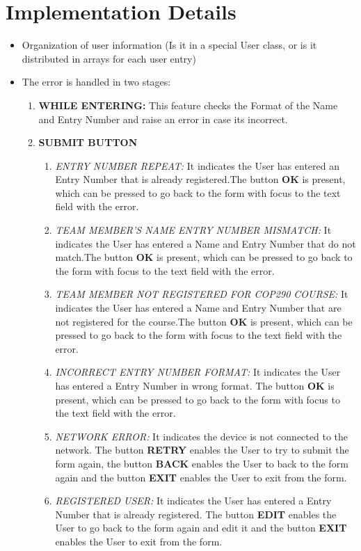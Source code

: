 \documentclass[12pt]{article}
\begin{document}
\section{Implementation Details}

\begin{itemize}
\item Organization of user information (Is it in a special User class, or is it distributed in arrays for each user entry)
\item The error is handled in two stages: 
\begin{enumerate}
\item \textbf{WHILE ENTERING:} This feature checks the Format of the Name and Entry Number and raise an error in case its incorrect.
\item \textbf{SUBMIT BUTTON}
\begin{enumerate}
            \item \textit{ENTRY NUMBER REPEAT:} It indicates the User has entered an Entry Number that is already registered.The button \textbf{OK} is present, which can be pressed to go back to the form with focus to the text field with the error.
            
            \item \textit{TEAM MEMBER'S NAME ENTRY NUMBER MISMATCH:} It indicates the User has entered a Name and Entry Number that do not match.The button \textbf{OK} is present, which can be pressed to go back to the form with focus to the text field with the error. 
            
            \item \textit{TEAM MEMBER NOT REGISTERED FOR COP290 COURSE:} It indicates the User has entered a Name and Entry Number that are not registered for the course.The button \textbf{OK} is present, which can be pressed to go back to the form with focus to the text field with the error.
            
            \item \textit{INCORRECT ENTRY NUMBER FORMAT:} It indicates the User has entered a Entry Number in wrong format. The button \textbf{OK} is present, which can be pressed to go back to the form with focus to the text field with the error.
            \item \textit{NETWORK ERROR:} It indicates the device is not connected to the network. The button \textbf{RETRY} enables the User to try to submit the form again, the button \textbf{BACK} enables the User to back to the form again and the button \textbf{EXIT} enables the User to exit from the form.
            \item \textit{REGISTERED USER:} It indicates the User has entered a Entry Number that is already registered. The button \textbf{EDIT} enables the User to go back to the form again and edit it and the button \textbf{EXIT} enables the User to exit from the form.
            


\end{enumerate}
\end{enumerate}
\end{itemize}
\end{document}
